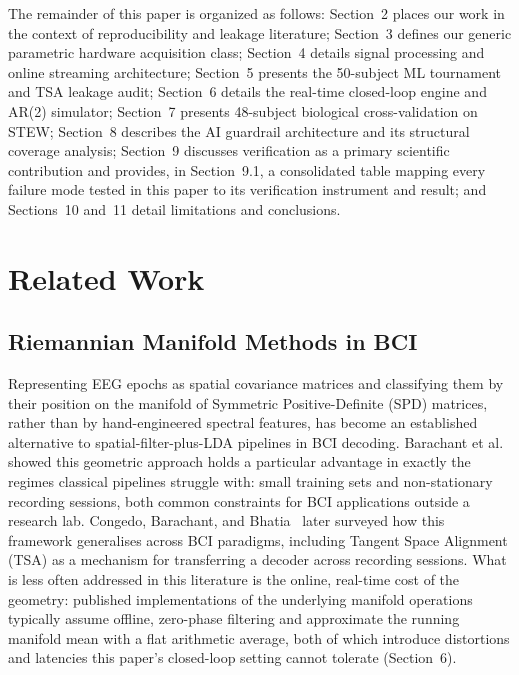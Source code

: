 \documentclass[11pt]{article}
\begin{document}
The remainder of this paper is organized as follows: Section~2 places our work in the context of reproducibility and leakage literature; Section~3 defines our generic parametric hardware acquisition class; Section~4 details signal processing and online streaming architecture; Section~5 presents the 50-subject ML tournament and TSA leakage audit; Section~6 details the real-time closed-loop engine and AR(2) simulator; Section~7 presents 48-subject biological cross-validation on STEW; Section~8 describes the AI guardrail architecture and its structural coverage analysis; Section~9 discusses verification as a primary scientific contribution and provides, in Section~9.1, a consolidated table mapping every failure mode tested in this paper to its verification instrument and result; and Sections~10 and~11 detail limitations and conclusions.

\section{Related Work}

\subsection{Riemannian Manifold Methods in BCI}

Representing EEG epochs as spatial covariance matrices and classifying them by their position on the manifold of Symmetric Positive-Definite (SPD) matrices, rather than by hand-engineered spectral features, has become an established alternative to spatial-filter-plus-LDA pipelines in BCI decoding. Barachant et al.~\cite{barachant2012} showed this geometric approach holds a particular advantage in exactly the regimes classical pipelines struggle with: small training sets and non-stationary recording sessions, both common constraints for BCI applications outside a research lab. Congedo, Barachant, and Bhatia~\cite{congedo2017} later surveyed how this framework generalises across BCI paradigms, including Tangent Space Alignment (TSA) as a mechanism for transferring a decoder across recording sessions. What is less often addressed in this literature is the online, real-time cost of the geometry: published implementations of the underlying manifold operations typically assume offline, zero-phase filtering and approximate the running manifold mean with a flat arithmetic average, both of which introduce distortions and latencies this paper's closed-loop setting cannot tolerate (Section~6).
\end{document}
